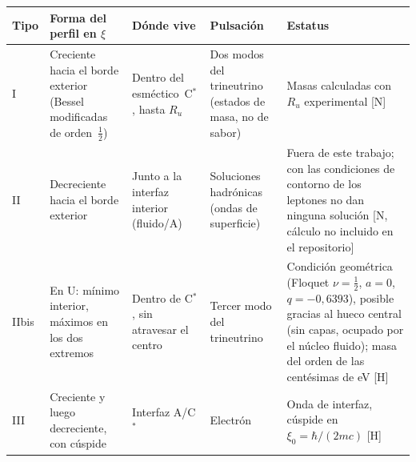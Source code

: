 \documentclass[11pt,a4paper]{article}
\newcommand{\st}[1]{\textup{[#1]}}
\newcommand{\Cst}{C\ensuremath{^{*}}}
\begin{document}
\begin{center}
\small
\begin{tabularx}{\textwidth}{@{}l Y Y Y Y@{}}
\toprule
Tipo & Forma del perfil en $\xi$ & Dónde vive & Pulsación & Estatus \\
\midrule
I & Creciente hacia el borde exterior (Bessel modificadas de orden~$\tfrac12$) & Dentro del esméctico~\Cst, hasta $R_u$ & Dos modos del trineutrino (estados de masa, no de sabor) & Masas calculadas con $R_u$ experimental \st{N} \\
\addlinespace
II & Decreciente hacia el borde exterior & Junto a la interfaz interior (fluido/A) & Soluciones hadrónicas (ondas de superficie) & Fuera de este trabajo; con las condiciones de contorno de los leptones no dan ninguna solución \st{N, cálculo no incluido en el repositorio} \\
\addlinespace
IIbis & En U: mínimo interior, máximos en los dos extremos & Dentro de \Cst, sin atravesar el centro & Tercer modo del trineutrino & Condición geométrica (Floquet $\nu=\tfrac12$, $a=0$, $q=-0,6393$), posible gracias al hueco central (sin capas, ocupado por el núcleo fluido); masa del orden de las centésimas de eV \st{H} \\
\addlinespace
III & Creciente y luego decreciente, con cúspide & Interfaz A/\Cst & Electrón & Onda de interfaz, cúspide en $\xi_0=\hbar/(2mc)$ \st{H} \\
\bottomrule
\end{tabularx}
\end{center}
\end{document}
